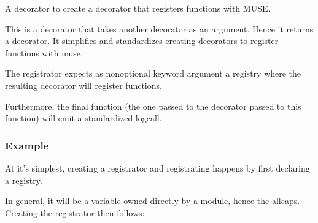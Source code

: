 \documentclass[letterpaper,10pt,english]{sphinxmanual}
\begin{document}
\begin{fulllineitems}
\label{\detokenize{api:muse.registration.registrator}}
A decorator to create a decorator that registers functions with MUSE.

This is a decorator that takes another decorator as an argument. Hence it
returns a decorator. It simplifies and standardizes creating decorators to
register functions with muse.

The registrator expects as non\sphinxhyphen{}optional keyword argument a registry where
the resulting decorator will register functions.

Furthermore, the final function (the one passed to the decorator passed to
this function) will emit a standardized log\sphinxhyphen{}call.
\subsubsection*{Example}

At it’s simplest, creating a registrator and registrating happens by
first declaring a registry.

\begin{sphinxVerbatim}[commandchars=\\\{\}]
  
\end{sphinxVerbatim}

In general, it will be a variable owned directly by a module, hence the
all\sphinxhyphen{}caps. Creating the registrator then follows:

\begin{sphinxVerbatim}[commandchars=\\\{\}]
   
 
             
 
     
\end{sphinxVerbatim}


\end{fulllineitems}
\end{document}
